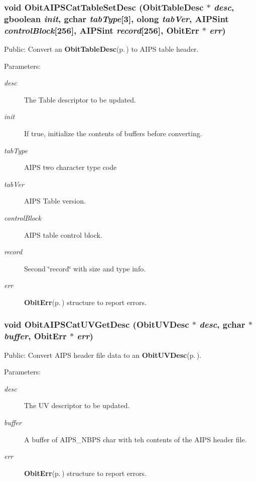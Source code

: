 \subsubsection{\setlength{\rightskip}{0pt plus 5cm}void Obit\-AIPSCat\-Table\-Set\-Desc ({\bf Obit\-Table\-Desc} $\ast$ {\em desc}, gboolean {\em init}, gchar {\em tab\-Type}[3], {\bf olong} {\em tab\-Ver}, {\bf AIPSint} {\em control\-Block}[256], {\bf AIPSint} {\em record}[256], {\bf Obit\-Err} $\ast$ {\em err})}\label{ObitAIPSCat_8c_a12}


Public: Convert an {\bf Obit\-Table\-Desc}{\rm (p.\,\pageref{structObitTableDesc})} to AIPS table header. 

\begin{Desc}
\item[Parameters:]
\begin{description}
\item[{\em desc}]The Table descriptor to be updated. \item[{\em init}]If true, initialize the contents of buffers before converting. \item[{\em tab\-Type}]AIPS two character type code \item[{\em tab\-Ver}]AIPS Table version. \item[{\em control\-Block}]AIPS table control block. \item[{\em record}]Second \char`\"{}record\char`\"{} with size and type info. \item[{\em err}]{\bf Obit\-Err}{\rm (p.\,\pageref{structObitErr})} structure to report errors. \end{description}
\end{Desc}
\subsubsection{\setlength{\rightskip}{0pt plus 5cm}void Obit\-AIPSCat\-UVGet\-Desc ({\bf Obit\-UVDesc} $\ast$ {\em desc}, gchar $\ast$ {\em buffer}, {\bf Obit\-Err} $\ast$ {\em err})}\label{ObitAIPSCat_8c_a7}


Public: Convert AIPS header file data to an {\bf Obit\-UVDesc}{\rm (p.\,\pageref{structObitUVDesc})}. 

\begin{Desc}
\item[Parameters:]
\begin{description}
\item[{\em desc}]The UV descriptor to be updated. \item[{\em buffer}]A buffer of AIPS\_\-NBPS char with teh contents of the AIPS header file. \item[{\em err}]{\bf Obit\-Err}{\rm (p.\,\pageref{structObitErr})} structure to report errors. \end{description}
\end{Desc}
